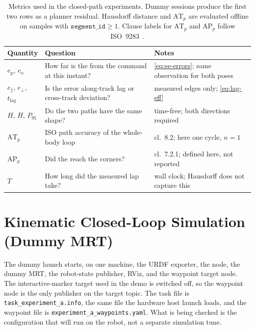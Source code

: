 \begin{table}[htbp]
  \centering
  \caption[Metrics used in the closed-path experiments]{%
    Metrics used in the closed-path experiments. Dummy sessions produce
    the first two rows as a planner residual. Hausdorff distance and
    $\mathrm{AT}_{p}$ are evaluated offline on samples with
    $\texttt{segment\_id} \ge 1$. Clause labels for $\mathrm{AT}_{p}$ and
    $\mathrm{AP}_{p}$ follow ISO~9283~\cite{ISO9283}.}
  \label{tab:sim-metrics}
  \begin{tabularx}{\linewidth}{@{}lXl@{}}
    \toprule
    Quantity & Question & Notes \\
    \midrule
    $e_{\mathrm{p}}$, $e_{\mathrm{o}}$
      & How far is the \ee{} from the command at this instant?
      & \cref{eq:ee-errors}; same observation for both poses \\
    $e_{\parallel}$, $e_{\perp}$, $t_{\mathrm{lag}}$
      & Is the error along-track lag or cross-track deviation?
      & measured edges only; \cref{eq:lag-eff} \\
    $H$, $\overline{H}$, $P_{95}$
      & Do the two paths have the same shape?
      & time-free; both directions required \\
    $\mathrm{AT}_{p}$
      & ISO path accuracy of the whole-body loop
      & cl.~8.2; here one cycle, $n=1$ \\
    $\mathrm{AP}_{p}$
      & Did the \ee{} reach the corners?
      & cl.~7.2.1; defined here, not reported \\
    $T$
      & How long did the measured lap take?
      & wall clock; Hausdorff does not capture this \\
    \bottomrule
  \end{tabularx}
\end{table}

\section{Kinematic Closed-Loop Simulation (Dummy MRT)}
\label{sec:sim-dummy}

The dummy launch starts, on one machine, the URDF exporter, the \mpc{}
node, the dummy MRT, the robot-state publisher, RViz, and the waypoint
target node. The interactive-marker target used in the \ocs{} demo is
switched off, so the waypoint node is the only publisher on the \mpc{}
target topic. The task file is \texttt{task\_experiment\_a.info}, the
same file the hardware host launch loads, and the waypoint file is
\texttt{experiment\_a\_waypoints.yaml}. What is being checked is the
configuration that will run on the robot, not a separate simulation
tune.

